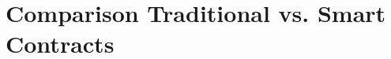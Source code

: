 \chapter{Comparison Traditional vs. Smart Contracts}\label{chap:comp}
\chapterstart



\chapterend

